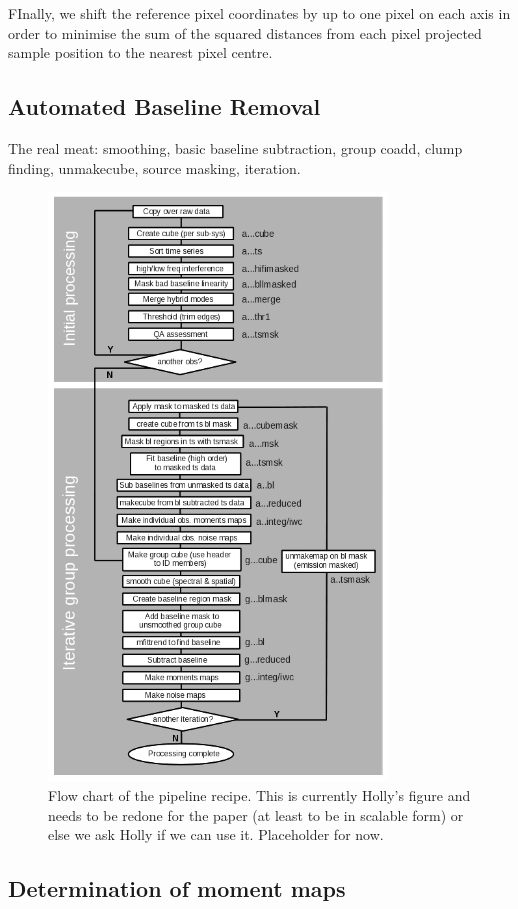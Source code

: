 \documentclass[final,authoryear,5p,times,twocolumn]{elsarticle}
\begin{document}
FInally, we shift the reference pixel coordinates by up to one pixel
on each axis in order to minimise the sum of the squared distances
from each pixel projected sample position to the nearest pixel centre.

\subsection{Automated Baseline Removal}

The real meat: smoothing, basic baseline subtraction, group coadd,
clump finding, unmakecube, source masking, iteration.

\begin{figure}
\includegraphics[width=90mm]{flowchart.png}
\caption{Flow chart of the pipeline recipe. This is currently Holly's
  figure and needs to be redone for the paper (at least to be in
  scalable form) or else we ask Holly if we can use it. Placeholder
  for now.}
\label{fig:flowchart}
\end{figure}

\subsection{Determination of moment maps}
\end{document}
